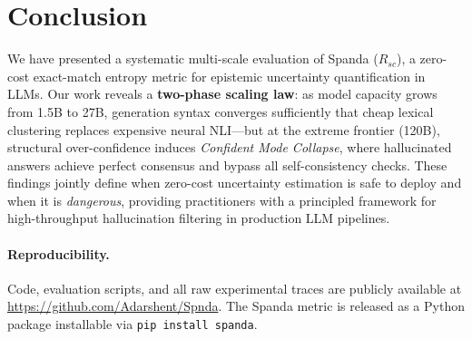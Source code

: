 \documentclass[11pt]{article}
\begin{document}
\section{Conclusion}

We have presented a systematic multi-scale evaluation of Spanda ($R_{sc}$), a zero-cost exact-match entropy metric for epistemic uncertainty quantification in LLMs. Our work reveals a \textbf{two-phase scaling law}: as model capacity grows from 1.5B to 27B, generation syntax converges sufficiently that cheap lexical clustering replaces expensive neural NLI---but at the extreme frontier (120B), structural over-confidence induces \textit{Confident Mode Collapse}, where hallucinated answers achieve perfect consensus and bypass all self-consistency checks. These findings jointly define when zero-cost uncertainty estimation is safe to deploy and when it is \textit{dangerous}, providing practitioners with a principled framework for high-throughput hallucination filtering in production LLM pipelines.

\paragraph{Reproducibility.} Code, evaluation scripts, and all raw experimental traces are publicly available at \url{https://github.com/Adarshent/Spnda}. The Spanda metric is released as a Python package installable via \texttt{pip install spanda}.
\end{document}

